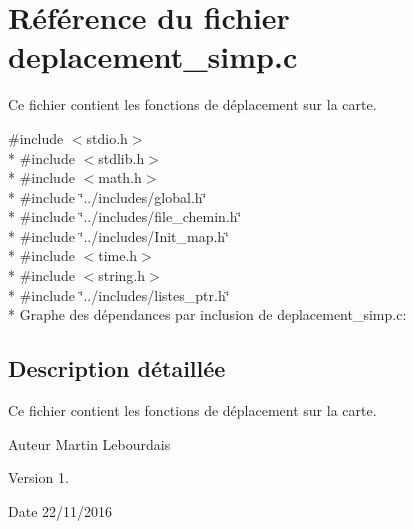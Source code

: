 \hypertarget{a00014}{}\section{Référence du fichier deplacement\+\_\+simp.\+c}
\label{a00014}


Ce fichier contient les fonctions de déplacement sur la carte.  


{\ttfamily \#include $<$stdio.\+h$>$}\\*
{\ttfamily \#include $<$stdlib.\+h$>$}\\*
{\ttfamily \#include $<$math.\+h$>$}\\*
{\ttfamily \#include \char`\"{}../includes/global.\+h\char`\"{}}\\*
{\ttfamily \#include \char`\"{}../includes/file\+\_\+chemin.\+h\char`\"{}}\\*
{\ttfamily \#include \char`\"{}../includes/\+Init\+\_\+map.\+h\char`\"{}}\\*
{\ttfamily \#include $<$time.\+h$>$}\\*
{\ttfamily \#include $<$string.\+h$>$}\\*
{\ttfamily \#include \char`\"{}../includes/listes\+\_\+ptr.\+h\char`\"{}}\\*
Graphe des dépendances par inclusion de deplacement\+\_\+simp.\+c\+:


\subsection{Description détaillée}
Ce fichier contient les fonctions de déplacement sur la carte. 

\begin{DoxyAuthor}{Auteur}
Martin Lebourdais 
\end{DoxyAuthor}
\begin{DoxyVersion}{Version}
1. 
\end{DoxyVersion}
\begin{DoxyDate}{Date}
22/11/2016 
\end{DoxyDate}
